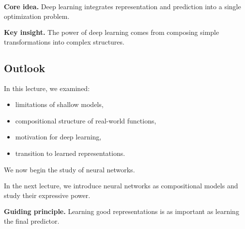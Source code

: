 \medskip

\noindent
\textbf{Core idea.}  
Deep learning integrates representation and prediction into a single optimization problem.

\medskip

\noindent
\textbf{Key insight.}  
The power of deep learning comes from composing simple transformations into complex structures.

\subsection{Outlook}

In this lecture, we examined:

\begin{itemize}
    \item limitations of shallow models,
    \item compositional structure of real-world functions,
    \item motivation for deep learning,
    \item transition to learned representations.
\end{itemize}

\medskip

\noindent
We now begin the study of neural networks.

\medskip

\noindent
In the next lecture, we introduce neural networks as compositional models and study their expressive power.

\medskip

\noindent
\textbf{Guiding principle.}  
Learning good representations is as important as learning the final predictor.